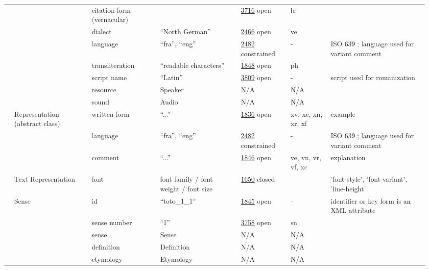 \documentclass[a4paper,12pt]{article}
\begin{document}
\begin{center}
\begin{longtable}{*7{p{2cm}}}
& & citation form (vernacular) & & \href{http://www.isocat.org/datcat/DC-3716}{3716} open & lc & \\ \cmidrule{3-7}
& & dialect & ``North German'' & \href{http://www.isocat.org/datcat/DC-2466}{2466} open & ve & \\ \cmidrule{3-7}
& & language & ``fra'', ``eng'' & \href{http://www.isocat.org/datcat/DC-2482}{2482} constrained & - & ISO 639 ; language used for variant comment \\ \cmidrule{3-7}
& & trans\-li\-te\-ra\-tion & ``readable characters'' & \href{http://www.isocat.org/datcat/DC-1848}{1848} open & ph & \\ \cmidrule{3-7}
& & script name & ``Latin'' & \href{http://www.isocat.org/datcat/DC-3809}{3809} open & - & script used for romanization \\ \cmidrule{3-7}
& & resource & Speaker & N/A & N/A & \\ \cmidrule{3-7}
& & sound & Audio & N/A & N/A & \\ \cmidrule{2-7}
& \multirow{3}{2cm}{Re\-pre\-sen\-ta\-tion (abstract class)} & written form & ``...'' & \href{http://www.isocat.org/datcat/DC-1836}{1836} open & xv, xe, xn, xr, xf & example \\ \cmidrule{3-7}
& & language & ``fra'', ``eng'' & \href{http://www.isocat.org/datcat/DC-2482}{2482} constrained & - & ISO 639 ; language used for variant comment \\ \cmidrule{3-7}
& & comment & ``...'' & \href{http://www.isocat.org/datcat/DC-1846}{1846} open & ve, vn, vr, vf, xc & explanation \\ \cmidrule{2-7}
& \multirow{1}{2cm}{Text Re\-pre\-sen\-ta\-tion} & font & font family / font weight / font size & \href{http://www.isocat.org/datcat/DC-1650}{1650} closed & & 'font-style', 'font-variant', 'line-height' \\ \cmidrule{2-7}
& \multirow{9}{2cm}{Sense} & id & ``toto\_1\_1'' & \href{http://www.isocat.org/datcat/DC-1845}{1845} open & - & identifier or key form is an XML attribute \\ \cmidrule{3-7}
& & sense number & ``1'' & \href{http://www.isocat.org/datcat/DC-3758}{3758} open & sn & \\ \cmidrule{3-7}
& & sense & Sense & N/A & N/A & \\ \cmidrule{3-7}
& & definition & Definition & N/A & N/A & \\ \cmidrule{3-7}
& & etymology & Etymology & N/A & N/A & \\ \cmidrule{3-7}

\end{longtable}
\end{center}
\end{document}
